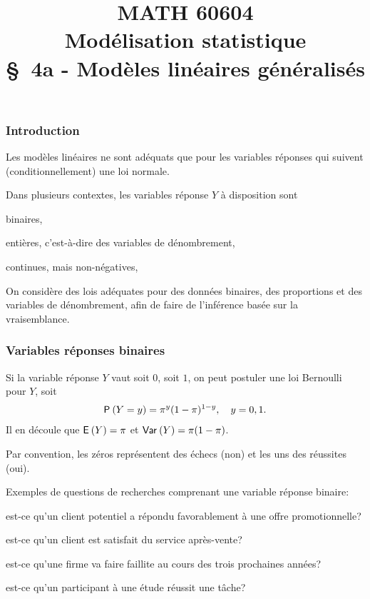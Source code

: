 \documentclass{beamer}
\title[\color{white}{MATH 60604 \S~4a - Modèles linéaires généralisés}]{\texorpdfstring{MATH 60604 \\Modélisation statistique \\ \S~4a - Modèles linéaires généralisés}{MATH 60604 \\Modélisation statistique \\ \S~4a - Modèles linéaires généralisés}}
\author{}
\institute{HEC Montréal\\
Département de sciences de la décision}
\date{}
\begin{document}
\frame{\titlepage}
\begin{frame}
\frametitle{Introduction}
\bi
\item Les modèles linéaires ne sont adéquats que pour les variables réponses qui suivent (conditionnellement) une loi normale.

\item Dans plusieurs contextes, les variables réponse $Y$ à disposition sont
\bi
\item \alert{binaires}, 
\item entières, c'est-à-dire des variables de \alert{dénombrement}, 
\item \alert{continues, mais non-négatives}, 
\ei
\item On considère des lois adéquates pour des données binaires, des proportions et des variables de dénombrement, afin de faire de l'inférence basée sur la vraisemblance.
\ei
\end{frame}


\begin{frame}
\frametitle{Variables réponses binaires}
\bi
\item Si la variable réponse $Y$ vaut soit $0$, soit $1$, on peut postuler une loi \alert{Bernoulli} pour $Y$, soit
\begin{align*}
\P{Y=y} = \pi^y (1-\pi)^{1-y}, \quad y=0, 1.
\end{align*}
Il en découle que $\E{Y}=\pi$ et $\Va{Y}=\pi(1-\pi)$.
\item Par convention, les zéros représentent des échecs (non) et les uns des réussites (oui).
\item Exemples de questions de recherches comprenant une variable réponse binaire:
\bi
\item est-ce qu'un client potentiel a répondu favorablement à une offre
promotionnelle?
\item est-ce qu'un client est satisfait du service après-vente?
\item est-ce qu'une firme va faire faillite au cours des trois prochaines années?
\item est-ce qu'un participant à une étude réussit une tâche?
\ei
\ei
\end{frame}
\end{document}
